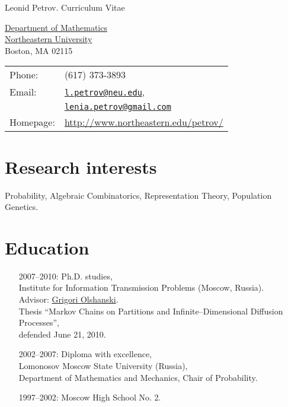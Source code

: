 \documentclass[letterpaper,11pt]{article}
\def\name{Leonid Petrov. Curriculum Vitae}
\begin{document}
{\huge \name}


\vspace{0.25in}

\begin{minipage}{0.45\linewidth}
  \href{http://www.math.neu.edu/}{
  Department of Mathematics\\
  Northeastern University} \\
  Boston, MA 02115 
\end{minipage}
\begin{minipage}{0.45\linewidth}
  \begin{tabular}{ll}
    Phone: & (617) 373-3893 \\
    Email: & 
    \href{mailto:l.petrov@neu.edu}{\tt l.petrov@neu.edu},\\&
    \href{mailto:lenia.petrov@gmail.com}{\tt lenia.petrov@gmail.com}
    \\
    Homepage: & \url{http://www.northeastern.edu/petrov/} \\
  \end{tabular}
\end{minipage}

\section*{Research interests}

Probability, Algebraic Combinatorics, Representation Theory, Population Genetics.

\section*{Education}

\begin{itemize}
  \item[2007--2010:]
  Ph.D. studies,\\Institute for Information Transmission Problems (Moscow, Russia).
  \\
  Advisor: \href{http://www.iitp.ru/en/userpages/88/}{Grigori Olshanski}.\\
  Thesis ``Markov Chains on Partitions and Infinite--Dimensional Diffusion Processes'',\\
  defended
  June 21, 2010.

  \item[2002--2007:]
  Diploma with excellence,\\
  Lomonosov Moscow State University (Russia),\\ Department of Mathematics and Mechanics, Chair of Probability.

  \item 
  [1997--2002:] Moscow High School No. 2.
\end{itemize}
\end{document}
